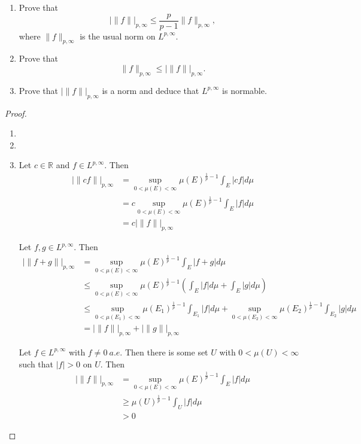 \documentclass[a4paper]{article}
\newcommand{\R}{\mathbb{R}}
\begin{document}
\begin{enumerate}
    \begin{enumerate}
      \item Prove that
        \[ | \| f \| |_{p,\infty} \leq \frac{p}{p-1} \|f\|_{p,\infty} ,\]
        where $\|f\|_{p,\infty}$ is the usual norm on $L^{p,\infty}$.

      \item Prove that
        \[ \|f\|_{p,\infty} \leq | \| f \| |_{p,\infty} .\]

      \item Prove that $| \| f \| |_{p,\infty}$ is a norm and deduce that $L^{p,\infty}$ is normable.

    \end{enumerate}

    \begin{proof}

      \begin{enumerate}
        \item

        \item

        \item
          Let $c \in \R$ and $f \in L^{p,\infty}$. Then
          \begin{align*}
            | \| cf \| |_{p,\infty} &= \sup_{0 < \mu(E) < \infty} \mu(E)^{\frac{1}{p}-1} \int_{E}^{} |cf| d\mu \\
            &= c \sup_{0 < \mu(E) < \infty} \mu(E)^{\frac{1}{p} - 1} \int_{E}^{} |f| d\mu \\
            &= c | \| f \| |_{p,\infty}
          \end{align*}

          Let $f,g \in L^{p,\infty}$. Then
          \begin{align*}
            | \| f+g \| |_{p,\infty} &= \sup_{0 < \mu(E) < \infty} \mu(E)^{\frac{1}{p} - 1} \int_{E}^{} |f+g| d\mu \\
            &\leq \sup_{0 < \mu(E) < \infty} \mu(E)^{\frac{1}{p} - 1} \left( \int_{E}^{} |f| d\mu + \int_{E}^{} |g| d\mu \right) \\
            &\leq \sup_{0 < \mu(E_1) < \infty} \mu(E_1)^{\frac{1}{p} - 1} \int_{E_1}^{} |f| d\mu + \sup_{0 < \mu(E_2) < \infty}
            \mu(E_2)^{\frac{1}{p} - 1} \int_{E_2}^{} |g| d\mu \\
            &= | \|f\| |_{p,\infty} + | \|g\| |_{p,\infty}
          \end{align*}

          Let $f \in L^{p,\infty}$ with $f \neq 0 \ a.e.$ Then there is some set $U$ with $0 < \mu(U) < \infty$ such that $|f|>0$ on $U$. Then
          \begin{align*}
            | \| f \| |_{p,\infty} &= \sup_{0 < \mu(E) < \infty} \mu(E)^{\frac{1}{p}-1} \int_{E}^{} |f| d\mu \\
            &\geq \mu(U)^{\frac{1}{p}-1} \int_{U}^{} |f| d\mu \\
            &>0
          \end{align*}


\end{enumerate}
\end{proof}
\end{enumerate}
\end{document}
